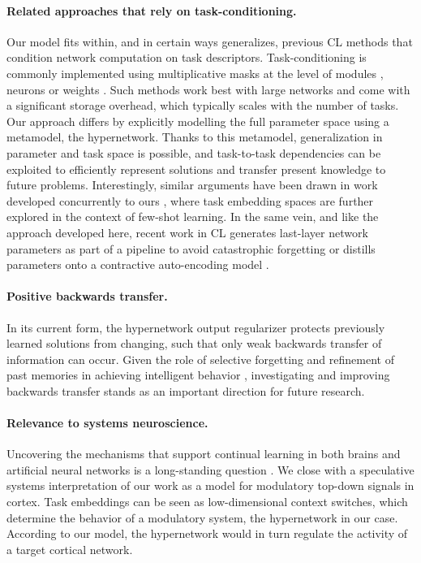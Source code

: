 \documentclass{article}
\begin{document}
\paragraph{Related approaches that rely on task-conditioning.} Our model fits within, and in certain ways generalizes, previous CL methods that condition network computation on task descriptors. Task-conditioning is commonly implemented using multiplicative masks at the level of modules \citep{rusu_progressive_2016,fernando2017pathnet}, neurons \citep{pmlr-v80-serra18a,masse2018alleviating} or weights \citep{mallya2018packnet}. Such methods work best with large networks and come with a significant storage overhead, which typically scales with the number of tasks. Our approach differs by explicitly modelling the full parameter space using a metamodel, the hypernetwork. Thanks to this metamodel, generalization in parameter and task space is possible, and task-to-task dependencies can be exploited to efficiently represent solutions and transfer present knowledge to future problems. Interestingly, similar arguments have been drawn in work developed concurrently to ours \citep{lampinen2019embedded}, where task embedding spaces are further explored in the context of few-shot learning. In the same vein, and like the approach developed here, recent work in CL generates last-layer network parameters as part of a pipeline to avoid catastrophic forgetting \citep{hu2018overcoming} or distills parameters onto a contractive auto-encoding model \citep{camp2018self}.

\vspace{-2mm}
\paragraph{Positive backwards transfer.} In its current form, the hypernetwork output regularizer protects previously learned solutions from changing, such that only weak backwards transfer of information can occur. Given the role of selective forgetting and refinement of past memories in achieving intelligent behavior \citep{brea_normative_2014,richards_persistence_2017}, investigating and improving backwards transfer stands as an important direction for future research.

\vspace{-2mm}
\paragraph{Relevance to systems neuroscience.} Uncovering the mechanisms that support continual learning in both brains and artificial neural networks is a long-standing question  \citep{mccloskey_catastrophic_1989,french_catastrophic_1999,parisi_continual_2019}. We close with a speculative systems interpretation \citep{kumaran_what_2016,hassabis_neuroscience-inspired_2017} of our work as a model for modulatory top-down signals in cortex. Task embeddings can be seen as low-dimensional context switches, which determine the behavior of a modulatory system, the hypernetwork in our case. According to our model, the hypernetwork would in turn regulate the activity of a target cortical network.
\end{document}
